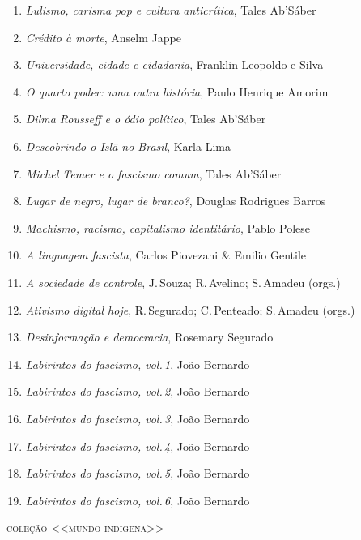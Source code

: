 \begin{enumerate}
\setlength\parskip{4.2pt}
\setlength\itemsep{-1.4mm}
\item \textit{Lulismo, carisma pop e cultura anticrítica}, Tales Ab'Sáber
\item \textit{Crédito à morte}, Anselm Jappe
\item \textit{Universidade, cidade e cidadania}, Franklin Leopoldo e Silva
\item \textit{O quarto poder: uma outra história}, Paulo Henrique Amorim
\item \textit{Dilma Rousseff e o ódio político}, Tales Ab'Sáber
\item \textit{Descobrindo o Islã no Brasil}, Karla Lima
\item \textit{Michel Temer e o fascismo comum}, Tales Ab'Sáber
\item \textit{Lugar de negro, lugar de branco?}, Douglas Rodrigues Barros
\item \textit{Machismo, racismo, capitalismo identitário}, Pablo Polese
\item \textit{A linguagem fascista}, Carlos Piovezani \& Emilio Gentile
\item \textit{A sociedade de controle}, J.\,Souza; R.\,Avelino; S.\,Amadeu (orgs.)
\item \textit{Ativismo digital hoje}, R.\,Segurado; C.\,Penteado; S.\,Amadeu (orgs.)
\item \textit{Desinformação e democracia}, Rosemary Segurado
\item \textit{Labirintos do fascismo, vol.\,1}, João Bernardo
\item \textit{Labirintos do fascismo, vol.\,2}, João Bernardo
\item \textit{Labirintos do fascismo, vol.\,3}, João Bernardo
\item \textit{Labirintos do fascismo, vol.\,4}, João Bernardo
\item \textit{Labirintos do fascismo, vol.\,5}, João Bernardo
\item \textit{Labirintos do fascismo, vol.\,6}, João Bernardo
\end{enumerate}

\medskip
{\large\textsc{coleção <<mundo indígena>>}}

